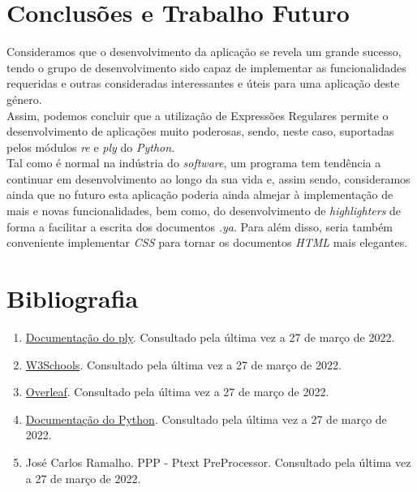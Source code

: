 \documentclass{article}
\begin{document}
\section{Conclusões e Trabalho Futuro}
Consideramos que o desenvolvimento da aplicação se revela um grande sucesso, tendo o grupo de desenvolvimento sido capaz de implementar as funcionalidades requeridas e outras consideradas interessantes e úteis para uma aplicação deste género.\\
 Assim, podemos concluir que a utilização de Expressões Regulares permite o desenvolvimento de aplicações muito poderosas, sendo, neste caso, suportadas pelos módulos \textit{re} e \textit{ply} do \textit{Python}.\\
 Tal como é normal na indústria do \textit{software}, um programa tem tendência a continuar em desenvolvimento ao longo da sua vida e, assim sendo, consideramos ainda que no futuro esta aplicação poderia ainda almejar à implementação de mais e novas funcionalidades, bem como, do desenvolvimento de \textit{highlighters} de forma a facilitar a escrita dos documentos \textit{.ya}. Para além disso, seria também conveniente implementar \textit{CSS} para tornar os documentos \textit{HTML} mais elegantes.\section{Bibliografia}

\begin{enumerate}
\item \href{https://www.dabeaz.com/ply/ply.html}{Documentação do ply}. Consultado pela última vez a 27 de março de 2022.
\item \href{https://www.w3schools.com/TAgs/default.asp}{W3Schools}. Consultado pela última vez a 27 de março de 2022.
\item \href{https://www.overleaf.com/learn}{Overleaf}. Consultado pela última vez a 27 de março de 2022.
\item \href{https://docs.python.org/3/}{Documentação do Python}. Consultado pela última vez a 27 de março de 2022.
\item José Carlos Ramalho. PPP - Ptext PreProcessor. Consultado pela última vez a 27 de março de 2022.
\end{enumerate}
\end{document}
